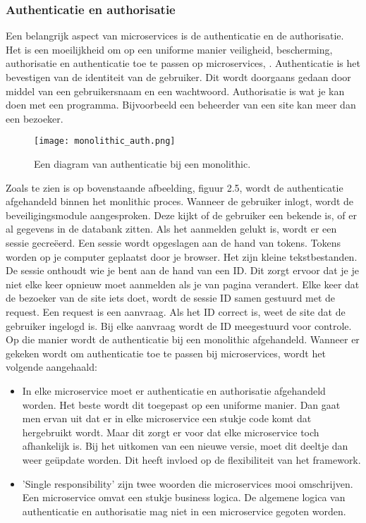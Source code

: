 \subsubsection{Authenticatie en authorisatie}
Een belangrijk aspect van microservices is de authenticatie en de authorisatie.  Het is een moeilijkheid om op een uniforme manier veiligheid, bescherming, authorisatie en authenticatie toe te passen op microservices, \textcite{Ayoub2018}. Authenticatie is het bevestigen van de identiteit van de gebruiker. Dit wordt doorgaans gedaan door middel van een gebruikersnaam en een wachtwoord. Authorisatie is wat je kan doen met een programma. Bijvoorbeeld een beheerder van een site kan meer dan een bezoeker. 
\begin{figure}[h!]
	\texttt{[image: monolithic\_auth.png]}
	\centering
	\caption{Een diagram van authenticatie bij een monolithic. \textcite{Ayoub2018}}
\end{figure}
Zoals te zien is op bovenstaande afbeelding, figuur 2.5, wordt de authenticatie afgehandeld binnen het monlithic proces. Wanneer de gebruiker inlogt, wordt de beveiligingsmodule aangesproken. Deze kijkt of de gebruiker een bekende is, of er al gegevens in de databank zitten. Als het aanmelden gelukt is, wordt er een sessie gecreëerd. Een sessie wordt opgeslagen aan de hand van tokens. Tokens worden op je computer geplaatst door je browser. Het zijn kleine tekstbestanden. De sessie onthoudt wie je bent aan de hand van een ID. Dit zorgt ervoor dat je je niet elke keer opnieuw moet aanmelden als je van pagina verandert.  Elke keer dat de bezoeker van de site iets doet, wordt de sessie ID samen gestuurd met de request. Een request is een aanvraag. Als het ID correct is,  weet de site dat de gebruiker ingelogd is. Bij elke aanvraag wordt de ID meegestuurd voor controle. Op die manier wordt de authenticatie bij een monolithic afgehandeld.
Wanneer er gekeken wordt om authenticatie toe te passen bij microservices, wordt het volgende aangehaald:
\begin{itemize}
	\item In elke microservice moet er authenticatie en authorisatie afgehandeld worden. Het beste wordt dit toegepast op een uniforme manier. Dan gaat men ervan uit dat er in elke microservice een stukje code komt dat hergebruikt wordt. Maar dit zorgt er voor dat elke microservice toch afhankelijk is. Bij het uitkomen van een nieuwe  versie, moet dit deeltje dan  weer geüpdate worden. Dit heeft invloed op de flexibiliteit van het framework.
	\item 'Single responsibility' zijn twee woorden die microservices mooi omschrijven. Een microservice omvat een stukje business logica. De algemene logica van authenticatie en authorisatie mag niet in een microservice gegoten worden. 
\end{itemize}
